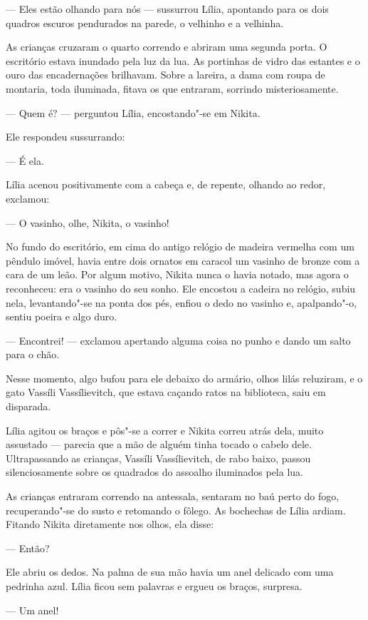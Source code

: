 --- Eles estão olhando para nós --- sussurrou Lília, apontando para os
dois quadros escuros pendurados na parede, o velhinho e a velhinha.

As crianças cruzaram o quarto correndo e abriram uma segunda porta. O
escritório estava inundado pela luz da lua. As portinhas de vidro das
estantes e o ouro das encadernações brilhavam. Sobre a lareira, a dama
com roupa de montaria, toda iluminada, fitava os que entraram, sorrindo
misteriosamente.

--- Quem é? --- perguntou Lília, encostando"-se em Nikita.

Ele respondeu sussurrando:

--- É ela.

Lília acenou positivamente com a cabeça e, de repente, olhando ao redor,
exclamou:

--- O vasinho, olhe, Nikita, o vasinho!

No fundo do escritório, em cima do antigo relógio de madeira vermelha
com um pêndulo imóvel, havia entre dois ornatos em caracol um vasinho de
bronze com a cara de um leão. Por algum motivo, Nikita nunca o havia
notado, mas agora o reconheceu: era o vasinho do seu sonho. Ele encostou
a cadeira no relógio, subiu nela, levantando"-se na ponta dos pés, enfiou o dedo
no vasinho e, apalpando"-o, sentiu poeira e algo duro.

--- Encontrei! --- exclamou apertando alguma coisa no punho e dando um
salto para o chão.

Nesse momento, algo bufou para ele debaixo do armário, olhos lilás
reluziram, e o gato Vassíli Vassílievitch, que estava caçando ratos na
biblioteca, saiu em disparada.

Lília agitou os braços e pôs"-se a correr e Nikita correu atrás dela,
muito assustado --- parecia que a mão de alguém tinha tocado o cabelo
dele. Ultrapassando as crianças, Vassíli Vassílievitch, de rabo baixo,
passou silenciosamente sobre os quadrados do assoalho iluminados pela
lua.

As crianças entraram correndo na antessala, sentaram no baú perto do
fogo, recuperando"-se do susto e retomando o fôlego. As bochechas de
Lília ardiam. Fitando Nikita diretamente nos olhos, ela disse:

--- Então?

Ele abriu os dedos. Na palma de sua mão havia um anel delicado com uma
pedrinha azul. Lília ficou sem palavras e ergueu os braços, surpresa.

--- Um anel!

